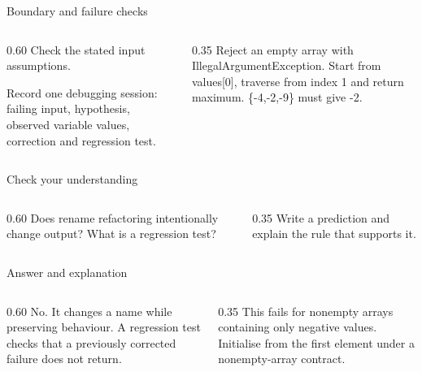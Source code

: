 \documentclass[10pt,aspectratio=169]{beamer}
\begin{document}
\begin{frame}[fragile,t]{Boundary and failure checks}
\begin{columns}[T,onlytextwidth]\begin{column}{0.60\textwidth}
Check the stated input assumptions.

Record one debugging session: failing input, hypothesis, observed variable values, correction and regression test.
\end{column}\begin{column}{0.35\textwidth}\small
Reject an empty array with IllegalArgumentException. Start from values[0], traverse from index 1 and return maximum. \{-4,-2,-9\} must give -2.
\end{column}\end{columns}
\end{frame}

\begin{frame}[fragile,t]{Check your understanding}
\begin{columns}[T,onlytextwidth]\begin{column}{0.60\textwidth}
Does rename refactoring intentionally change output? What is a regression test?
\end{column}\begin{column}{0.35\textwidth}\small
Write a prediction and explain the rule that supports it.
\end{column}\end{columns}
\end{frame}

\begin{frame}[fragile,t]{Answer and explanation}
\begin{columns}[T,onlytextwidth]\begin{column}{0.60\textwidth}
No. It changes a name while preserving behaviour. A regression test checks that a previously corrected failure does not return.
\end{column}\begin{column}{0.35\textwidth}\small
This fails for nonempty arrays containing only negative values. Initialise from the first element under a nonempty-array contract.
\end{column}\end{columns}
\end{frame}
\end{document}
